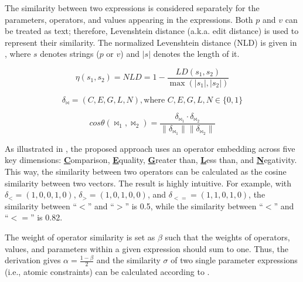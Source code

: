 The similarity between two expressions is considered separately for the parameters, operators, and
values appearing in the expressions.
Both $p$ and $v$ can be treated as text; therefore, Levenshtein distance (a.k.a.
edit distance) is used to represent their similarity.
The normalized Levenshtein distance (NLD) is given in , where $s$ denotes strings ($p$
or $v$) and $|s|$ denotes the length of it.

\begin{equation}\label{eq:ld}
    \eta(s_1, s_2) = NLD =  1 - \frac{LD(s_1, s_2)}{\max(|s_1|, |s_2|)}
\end{equation}

\begin{equation}\label{eq:embedding}
    \delta_{\bowtie} = (C, E, G, L, N), \text{where } C, E, G, L, N \in \{0, 1\}
\end{equation}

\begin{equation}\label{eq:cossim}
    cos\theta(\bowtie_1, \bowtie_2) = \frac{\delta_{\bowtie_1} \cdot \delta_{\bowtie_2}}{\|\delta_{\bowtie_1}\| \|\delta_{\bowtie_2}\|}
\end{equation}

As illustrated in , the proposed approach uses an operator embedding across five key dimensions: \underline{\textbf{C}}omparison, \underline{\textbf{E}}quality, \underline{\textbf{G}}reater than, \underline{\textbf{L}}ess than, and \underline{\textbf{N}}egativity.
This way, the similarity between two operators can be calculated as the cosine
similarity between two vectors.
The result is highly intuitive. For example, with $\delta_{<} = (1, 0, 0, 1, 0)$, $\delta_{>} =
(1, 0, 1, 0, 0)$, and $\delta_{<=} = (1, 1, 0, 1, 0)$, the similarity between ``$<$'' and ``$>$''
is 0.5, while the similarity between ``$<$'' and ``$<=$'' is 0.82.

The weight of operator similarity is set as $\beta$ such that the weights of operators, values, and
parameters within a given expression should sum to one.
Thus, the derivation gives $\alpha = \frac{1 - \beta}{2}$ and the similarity $\sigma$ of two single parameter
expressions (i.e., atomic constraints) can be calculated according to .


